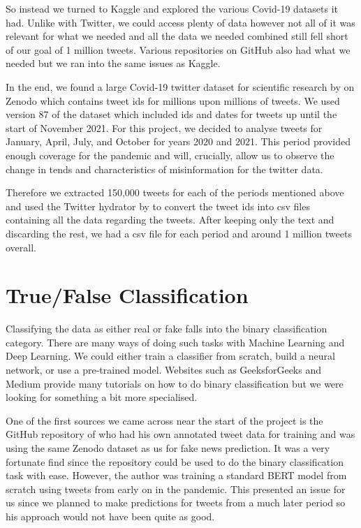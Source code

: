 \documentclass{l4proj}
\begin{document}
So instead we turned to Kaggle and explored the various Covid-19 datasets it had. Unlike with Twitter, we could access plenty of data however not all of it was relevant for what we needed and all the data we needed combined still fell short of our goal of 1 million tweets. Various repositories on GitHub also had what we needed but we ran into the same issues as Kaggle.

In the end, we found a large Covid-19 twitter dataset for scientific research by  \cite{banda_juan_m_2021_5652342} on Zenodo which contains tweet ids for millions upon millions of tweets. We used version 87 of the dataset which included ids and dates for tweets up until the start of November 2021. For this project, we decided to analyse tweets for January, April, July, and October for years 2020 and 2021. This period provided enough coverage for the pandemic and will, crucially, allow us to observe the change in tends and characteristics of misinformation for the twitter data.

Therefore we extracted 150,000 tweets for each of the periods mentioned above and used the Twitter hydrator by  \cite{hydrator} to convert the tweet ids into csv files containing all the data regarding the tweets. After keeping only the text and discarding the rest, we had a csv file for each period and around 1 million tweets overall.

\section{True/False Classification}
Classifying the data as either real or fake falls into the binary classification category. There are many ways of doing such tasks with Machine Learning and Deep Learning. We could either train a classifier from scratch, build a neural network, or use a pre-trained model. Websites such as GeeksforGeeks and Medium provide many tutorials on how to do binary classification but we were looking for something a bit more specialised.

One of the first sources we came across near the start of the project is the GitHub repository of  \cite{fnpcovid} who had his own annotated tweet data for training and was using the same Zenodo dataset as us for fake news prediction. It was a very fortunate find since the repository could be used to do the binary classification task with ease. However, the author was training a standard BERT model from scratch using tweets from early on in the pandemic. This presented an issue for us since we planned to make predictions for tweets from a much later period so his approach would not have been quite as good.
\end{document}

